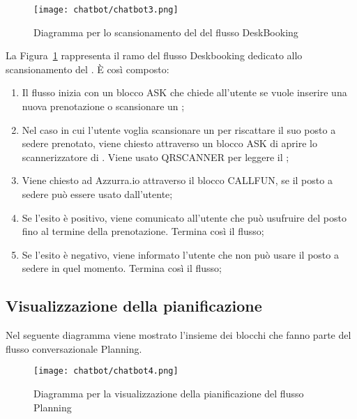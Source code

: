 \begin{figure}[h]
	\centering
	\texttt{[image: chatbot/chatbot3.png]}
	\caption{Diagramma per lo scansionamento del  del flusso DeskBooking}\label{fig:qrcode}
\end{figure}

La Figura~\ref{fig:qrcode} rappresenta il ramo del flusso Deskbooking dedicato allo scansionamento del . È così composto:

\begin{enumerate}
	\item Il flusso inizia con un blocco ASK che chiede all'utente se vuole inserire una nuova prenotazione o scansionare un ;
	\item Nel caso in cui l'utente voglia scansionare un  per riscattare il suo posto a sedere prenotato, viene chiesto attraverso un blocco ASK di aprire lo scannerizzatore di . Viene usato QRSCANNER per leggere il ;
	\item Viene chiesto ad Azzurra.io attraverso il blocco CALLFUN, se il posto a sedere può essere usato dall'utente;
	\item Se l'esito è positivo, viene comunicato all'utente che può usufruire del posto fino al termine della prenotazione. Termina così il flusso;
	\item Se l'esito è negativo, viene informato l'utente che non può usare il posto a sedere in quel momento. Termina così il flusso;
\end{enumerate}

\subsection{Visualizzazione della pianificazione}
Nel seguente diagramma viene mostrato l'insieme dei blocchi che fanno parte del flusso conversazionale Planning.

\begin{figure}[h]
	\centering
	\texttt{[image: chatbot/chatbot4.png]}
	\caption{Diagramma per la visualizzazione della pianificazione del flusso Planning}\label{fig:plan}
\end{figure}

